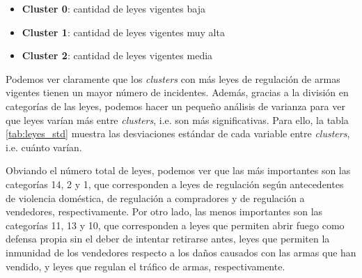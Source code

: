 \documentclass[11pt,a4paper]{article}
\begin{document}
\begin{itemize}
    \item \textbf{Cluster 0}: cantidad de leyes vigentes baja
    \item \textbf{Cluster 1}: cantidad de leyes vigentes muy alta
    \item \textbf{Cluster 2}: cantidad de leyes vigentes media
\end{itemize}

Podemos ver claramente que los \textit{clusters} con más leyes de regulación de armas vigentes tienen un mayor número de incidentes. Además, gracias a la división en categorías de las leyes, podemos hacer un pequeño análisis de varianza para ver que leyes varían más entre \textit{clusters}, i.e. son más significativas. Para ello, la tabla \ref{tab:leyes_std} muestra las desviaciones estándar de cada variable entre \textit{clusters}, i.e. cuánto varían.

Obviando el número total de leyes, podemos ver que las más importantes son las categorías 14, 2 y 1, que corresponden a leyes de regulación según antecedentes de violencia doméstica, de regulación a compradores y de regulación a vendedores, respectivamente. Por otro lado, las menos importantes son las categorías 11, 13 y 10, que corresponden a leyes que permiten abrir fuego como defensa propia sin el deber de intentar retirarse antes, leyes que permiten la inmunidad de los vendedores respecto a los daños causados con las armas que han vendido, y leyes que regulan el tráfico de armas, respectivamente.
\end{document}
